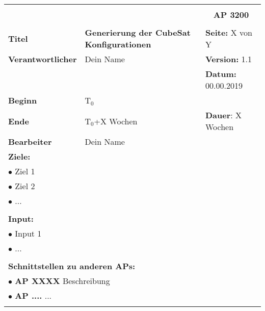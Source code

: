 \clearpage
\begin{table}[!h]
 \begin{center}
  \begin{tabular}{|p{35mm}||p{55mm}|p{50mm}||p{40mm}|}
   \hline
   \multicolumn{3}{|l||}{\textbf{}} & \multicolumn{1}{c|}{}\\
   \multicolumn{3}{|l||}{\textbf{}} & \multicolumn{1}{c|}{\textbf{AP 3200}}\\
   \multicolumn{3}{|l||}{\textbf{}} & \multicolumn{1}{c|}{}\\
   \hline\hline
   \textbf{Titel} & \multicolumn{2}{p{7cm}||}{\textbf{Generierung der CubeSat Konfigurationen}} & \textbf{Seite:} X von Y\\
   \hline
   \textbf{Verantwortlicher} & \multicolumn{2}{l||}{Dein Name} & \textbf{Version:} 1.1\\
   \hline
   \multicolumn{3}{|l||}{} & \textbf{Datum:} 00.00.2019\\
   \hline\hline
   \textbf{Beginn} & \multicolumn{2}{l||}{T$_0$} & \\
   \hline
   \textbf{Ende} & \multicolumn{2}{l||}{T$_0$+X Wochen} & \textbf{Dauer}: X Wochen\\
   \hline\hline
   \textbf{Bearbeiter} & \multicolumn{3}{l|}{Dein Name}\\
   \hline\hline
   \multicolumn{4}{|p{150mm}|}{\textbf{Ziele:}}\\
   \multicolumn{4}{|p{150mm}|}{$\bullet$ Ziel 1}\\
   \multicolumn{4}{|p{150mm}|}{$\bullet$ Ziel 2}\\
   \multicolumn{4}{|p{150mm}|}{$\bullet$ ...}\\
   \multicolumn{4}{|p{150mm}|}{}\\
   \multicolumn{4}{|p{150mm}|}{\textbf{Input:}}\\
   \multicolumn{4}{|p{150mm}|}{$\bullet$ Input 1}\\
   \multicolumn{4}{|p{150mm}|}{$\bullet$ ...}\\
   \multicolumn{4}{|p{150mm}|}{}\\
   \multicolumn{4}{|p{150mm}|}{\textbf{Schnittstellen zu anderen APs:}}\\
   \multicolumn{4}{|p{150mm}|}{$\bullet$ \textbf{AP XXXX} Beschreibung}\\
   \multicolumn{4}{|p{150mm}|}{$\bullet$ \textbf{AP ....} ...}\\
   \multicolumn{4}{|p{150mm}|}{}\\

\end{tabular}
\end{center}
\end{table}
